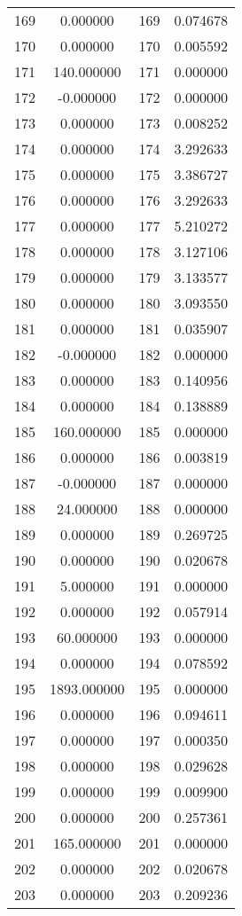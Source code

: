 \documentclass[12pt]{article}
\begin{document}
\begin{longtable}{@{}cccc@{}}
169 & 0.000000 & 169 & 0.074678 \\
170 & 0.000000 & 170 & 0.005592 \\
171 & 140.000000 & 171 & 0.000000 \\
172 & -0.000000 & 172 & 0.000000 \\
173 & 0.000000 & 173 & 0.008252 \\
174 & 0.000000 & 174 & 3.292633 \\
175 & 0.000000 & 175 & 3.386727 \\
176 & 0.000000 & 176 & 3.292633 \\
177 & 0.000000 & 177 & 5.210272 \\
178 & 0.000000 & 178 & 3.127106 \\
179 & 0.000000 & 179 & 3.133577 \\
180 & 0.000000 & 180 & 3.093550 \\
181 & 0.000000 & 181 & 0.035907 \\
182 & -0.000000 & 182 & 0.000000 \\
183 & 0.000000 & 183 & 0.140956 \\
184 & 0.000000 & 184 & 0.138889 \\
185 & 160.000000 & 185 & 0.000000 \\
186 & 0.000000 & 186 & 0.003819 \\
187 & -0.000000 & 187 & 0.000000 \\
188 & 24.000000 & 188 & 0.000000 \\
189 & 0.000000 & 189 & 0.269725 \\
190 & 0.000000 & 190 & 0.020678 \\
191 & 5.000000 & 191 & 0.000000 \\
192 & 0.000000 & 192 & 0.057914 \\
193 & 60.000000 & 193 & 0.000000 \\
194 & 0.000000 & 194 & 0.078592 \\
195 & 1893.000000 & 195 & 0.000000 \\
196 & 0.000000 & 196 & 0.094611 \\
197 & 0.000000 & 197 & 0.000350 \\
198 & 0.000000 & 198 & 0.029628 \\
199 & 0.000000 & 199 & 0.009900 \\
200 & 0.000000 & 200 & 0.257361 \\
201 & 165.000000 & 201 & 0.000000 \\
202 & 0.000000 & 202 & 0.020678 \\
203 & 0.000000 & 203 & 0.209236 \\

\end{longtable}
\end{document}

